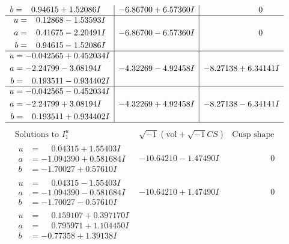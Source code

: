 \documentclass[1p]{elsarticle_modified}
\theoremstyle{definition}
\newcommand{\I}{\sqrt{-1}}
\begin{document}
$$\begin{array}{c|c|c}
\begin{aligned}
b &= \phantom{-}0.94615 + 1.52086 I\end{aligned}
 & -6.86700 + 6.57360 I & \phantom{-0.000000 } 0 \\ \hline\begin{aligned}
u &= \phantom{-}0.12868 - 1.53593 I \\
a &= \phantom{-}0.41675 - 2.20491 I \\
b &= \phantom{-}0.94615 - 1.52086 I\end{aligned}
 & -6.86700 - 6.57360 I & \phantom{-0.000000 } 0 \\ \hline\begin{aligned}
u &= -0.042565 + 0.452034 I \\
a &= -2.24799 - 3.08194 I \\
b &= \phantom{-}0.193511 - 0.934402 I\end{aligned}
 & -4.32269 - 4.92458 I & -8.27138 + 6.34141 I \\ \hline\begin{aligned}
u &= -0.042565 - 0.452034 I \\
a &= -2.24799 + 3.08194 I \\
b &= \phantom{-}0.193511 + 0.934402 I\end{aligned}
 & -4.32269 + 4.92458 I & -8.27138 - 6.34141 I\\
 \hline 
 \end{array}$$\newpage$$\begin{array}{c|c|c}  
\text{Solutions to }I^u_{1}& \I (\text{vol} + \sqrt{-1}CS) & \text{Cusp shape}\\
 \hline 
\begin{aligned}
u &= \phantom{-}0.04315 + 1.55403 I \\
a &= -1.094390 + 0.581684 I \\
b &= -1.70027 + 0.57610 I\end{aligned}
 & -10.64210 - 1.47490 I & \phantom{-0.000000 } 0 \\ \hline\begin{aligned}
u &= \phantom{-}0.04315 - 1.55403 I \\
a &= -1.094390 - 0.581684 I \\
b &= -1.70027 - 0.57610 I\end{aligned}
 & -10.64210 + 1.47490 I & \phantom{-0.000000 } 0 \\ \hline\begin{aligned}
u &= \phantom{-}0.159107 + 0.397170 I \\
a &= \phantom{-}0.795971 + 1.104450 I \\
b &= -0.77358 + 1.39138 I\end{aligned}

\end{array}$$
\end{document}
